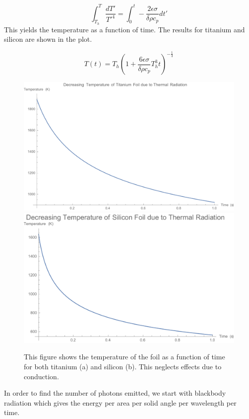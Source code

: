\documentclass[12pt]{article}
\begin{document}
\begin{equation}
\int_{T_h}^{T} \frac{dT'}{T'^4}=\int_0^t -\frac{2 \epsilon \sigma}{\delta \rho c_p} dt'
\end{equation}
This yields the temperature as a function of time. The results for titanium and silicon are shown in the plot.

\begin{equation}
T(t)=T_h \left( 1+\frac{6 \epsilon \sigma}{\delta \rho c_p} T_{h}^{3} t \right)^{-\frac{1}{3}}
\end{equation}

\begin{figure}
\begin{center}
\includegraphics[scale=0.5]{figures/TemperatureTi.PDF}
\includegraphics[scale=0.5]{figures/TemperatureSi.PDF}
\caption{This figure shows the temperature of the foil as a function of time for both titanium (a) and silicon (b). This neglects effects due to conduction.}
\end{center}
\end{figure}
In order to find the number of photons emitted, we start with blackbody radiation which gives the energy per area per solid angle per wavelength per time.
\end{document}
